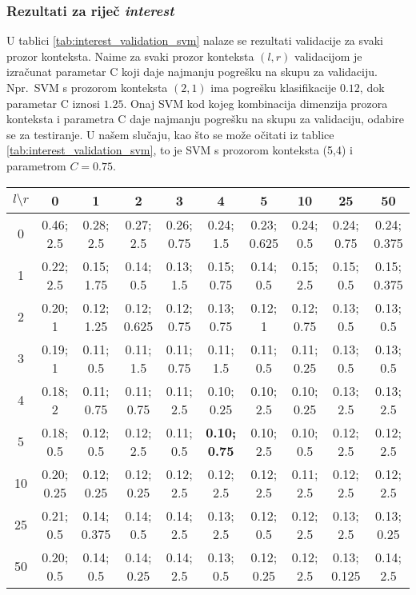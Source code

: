 \documentclass[10pt, a4paper]{article}
\begin{document}
\subsubsection{Rezultati za riječ \emph{interest}}
U tablici \ref{tab:interest_validation_svm} nalaze se rezultati validacije
za svaki prozor konteksta.
Naime za svaki prozor konteksta $(l,r)$ validacijom je izračunat parametar C koji
daje najmanju pogrešku na skupu za validaciju.
Npr.~SVM s prozorom konteksta $(2,1)$ ima pogrešku klasifikacije $0.12$,
dok parametar C iznosi $1.25$. 
Onaj SVM kod kojeg kombinacija dimenzija prozora konteksta i parametra C daje najmanju pogrešku na skupu za validaciju, odabire se za testiranje.
U našem slučaju, kao što se može očitati iz tablice \ref{tab:interest_validation_svm}, to je SVM s prozorom konteksta (5,4) i parametrom $C=0.75$.
\begin{table*}[!hbtp]
\caption{Pogreške i vrijednosti parametara C nakon provedene validacije SVM-a za riječ \emph{interest}.}
\label{tab:interest_validation_svm}
\begin{center}
\begin{tabular}{|c|ccccccccc|}
\hline
$l \setminus r$ & 0 & 1 & 2 & 3 & 4 & 5 & 10 & 25 & 50 \\
\hline
0 & 0.46; 2.5 & 0.28; 2.5 & 0.27; 2.5 & 0.26; 0.75 & 0.24; 1.5 & 0.23; 0.625 & 0.24; 0.5 & 0.24; 0.75 & 0.24; 0.375 \\
1 & 0.22; 2.5 & 0.15; 1.75 & 0.14; 0.5 & 0.13; 1.5 & 0.15; 0.75 & 0.14; 0.5 & 0.15; 2.5 & 0.15; 0.5 & 0.15; 0.375 \\
2 & 0.20; 1 & 0.12; 1.25 & 0.12; 0.625 & 0.12; 0.75 & 0.13; 0.75 & 0.12; 1 & 0.12; 0.75 & 0.13; 0.5 & 0.13; 0.5 \\
3 & 0.19; 1 & 0.11; 0.5 & 0.11; 1.5 & 0.11; 0.75 & 0.11; 1.5 & 0.11; 0.5 & 0.11; 0.25 & 0.13; 0.5 & 0.13; 0.5 \\
4 & 0.18; 2 & 0.11; 0.75 & 0.11; 0.75 & 0.11; 2.5 & 0.10; 0.25 & 0.10; 2.5 & 0.10; 0.25 & 0.13; 2.5 & 0.13; 2.5 \\
5 & 0.18; 0.5 & 0.12; 0.5 & 0.12; 2.5 & 0.11; 0.5 & \textbf{0.10; 0.75} & 0.10; 2.5 & 0.10; 0.5 & 0.12; 2.5 & 0.12; 2.5 \\
10 & 0.20; 0.25 & 0.12; 0.25 & 0.12; 0.25 & 0.12; 2.5 & 0.12; 2.5 & 0.12; 2.5 & 0.11; 2.5 & 0.12; 2.5 & 0.12; 2.5 \\
25 & 0.21; 0.5 & 0.14; 0.375 & 0.14; 0.5 & 0.14; 2.5 & 0.13; 2.5 & 0.12; 0.5 & 0.12; 2.5 & 0.13; 2.5 & 0.13; 0.25 \\
50 & 0.20; 0.5 & 0.14; 0.5 & 0.14; 0.25 & 0.14; 2.5 & 0.13; 0.5 & 0.12; 0.25 & 0.12; 2.5 & 0.13; 0.125 & 0.14; 2.5 \\
\hline
\end{tabular}
\end{center}
\end{table*}
\end{document}
